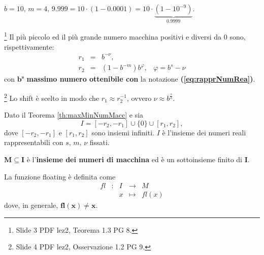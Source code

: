\begin{example}
    $b=10,\, m=4,\, 9.999=10\cdot(1-0.0001)=10\cdot\underbrace{(1-10^{-9})}_{0.9999}.$
\end{example}

\begin{theorem}\label{th:maxMinNumMacc}\footnote{Slide 3 PDF lez2, Teorema 1.3 PG 8.}
    Il più piccolo ed il più grande numero macchina positivi e diversi da 0 sono, rispettivamente:
    \begin{equation}\label{eq:minMaxNrPrecMacc}
        \begin{matrix}
            r_1 &=& b^{-\nu},&\\
            r_2 &=& (1-b^{-m})b^\varphi,& \varphi=b^s-\nu
        \end{matrix}
    \end{equation}
    con $\boldsymbol{b^s}$ \textbf{massimo numero ottenibile con} la notazione \textbf{(\ref{eq:rapprNumRea})}.
\end{theorem}

\begin{remark}\footnote{Slide 4 PDF lez2, Osservazione 1.2 PG 9.}
    Lo shift è scelto in modo che $r_1\approx r_2^{-1}$, ovvero $\nu\approx b^{\frac{s}{2}}$.
\end{remark}

\begin{definition}
    Dato il Teorema \ref{th:maxMinNumMacc} e sia 
\begin{equation}\label{eq:insDomFFloaPoint}
    I=[-r_2,-r_1]\cup \{0\}\cup [r_1,r_2],
\end{equation}
    dove $[-r_2,-r_1]$ e $[r_1,r_2]$ sono insiemi infiniti. $I$ è l'insieme dei numeri reali rappresentabili con $s,\,m,\,\nu$ fissati.
\end{definition}

\begin{definition}
    $\boldsymbol{M\subseteq I}$ è l'\textbf{insieme dei numeri di macchina} ed è un sottoinsieme finito di $\boldsymbol I$.
\end{definition}

\begin{definition}
    La funzione floating è definita come
    \begin{equation*}
        \begin{matrix}
        fl&:&I&\rightarrow& M\\
        &&x&\mapsto& fl(x)
        \end{matrix}
    \end{equation*}
    dove, in generale, $\boldsymbol{fl(x)\neq x}$. 
\end{definition}

